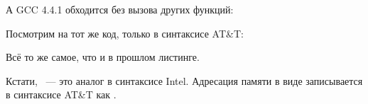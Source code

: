 
А GCC 4.4.1 обходится без вызова других функций:




Посмотрим на тот же код, только в синтаксисе AT\&T:



\myindex{\ATTSyntax}
Всё то же самое, что и в прошлом листинге.

Кстати, ~--- это аналог  в синтаксисе Intel.
Адресация памяти в виде  записывается в синтаксисе AT\&T как .

